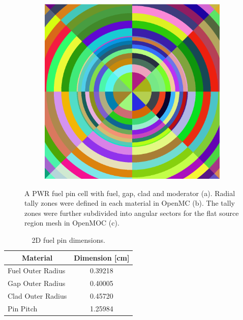 \begin{figure}[h!]
\begin{subfigure}{.33\textwidth}
  \caption{}
\end{subfigure}
\begin{subfigure}{.33\textwidth}
  \centering
  \includegraphics[width=0.9\linewidth]{figures/biases/pin-cell/pin-cell-8x8}
  \caption{}
\end{subfigure}
\caption[Pin cell materials and geometry]{A PWR fuel pin cell with fuel, gap, clad and moderator (a). Radial tally zones were defined in each material in OpenMC (b). The tally zones were further subdivided into angular sectors for the flat source region mesh in OpenMOC (c).}
\label{fig:chap4-pin-cell}
\end{figure}

\begin{table}[h!]
  \centering
  \caption{2D fuel pin dimensions.}
  \label{table:chap2-pin-dimensions} 
  \vspace{14pt}
  \begin{tabular}{l c}
  \toprule
  \multicolumn{1}{c}{\bf Material} &
  \multicolumn{1}{c}{\bf Dimension [cm]} \\
  \midrule
  Fuel Outer Radius &     0.39218 \\
  Gap Outer Radius &      0.40005 \\
  Clad Outer Radius &     0.45720 \\
  Pin Pitch &             1.25984 \\
  \bottomrule
\end{tabular}
\end{table}

